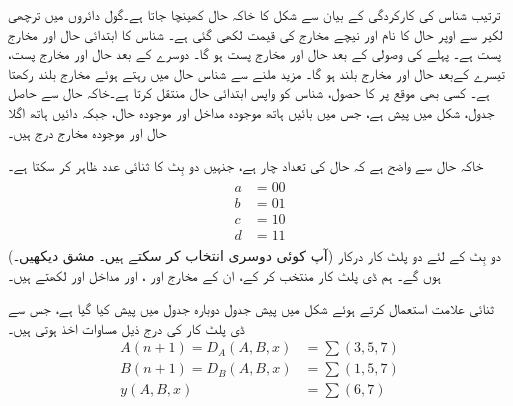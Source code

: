 \quad
ترتیب  شناس کی کارکردگی کے بیان سے شکل  کا   خاکہ حال   کھینچا  جاتا ہے۔گول دائروں میں ترچھی لکیر  سے  اوپر حال کا نام اور  نیچے مخارج کی قیمت  لکھی گئی ہے۔ شناس  کا ابتدائی      حال   اور  مخارج پست   ہے۔ پہلے  کی وصولی کے بعد  حال  اور  مخارج پست  ہو گا۔ دوسرے  کے بعد حال  اور مخارج پست، تیسرے   کےبعد حال  اور مخارج بلند ہو گا۔   مزید  ملنے سے شناس حال  میں رہتے ہوئے مخارج بلند رکھتا ہے۔ کسی بھی موقع پر   کا حصول، شناس  کو واپس ابتدائی حال  منتقل کرتا ہے۔خاکہ حال سے حاصل جدول،  شکل   میں پیش ہے، جس میں بائیں ہاتھ موجودہ مداخل اور موجودہ حال، جبکہ  دائیں ہاتھ اگلا حال اور موجودہ مخارج درج ہیں۔

خاکہ حال سے واضح  ہے کہ حال کی تعداد چار ہے، جنہیں دو بِٹ کا ثنائی عدد ظاہر کر سکتا ہے۔
\begin{gather}
\begin{aligned}\label{مساوات_ترتیبی_شناس_حال_انتخاب}
a&=00\\
b&=01\\
c&=10\\
d&=11
\end{aligned}
\end{gather}
(آپ کوئی دوسری  انتخاب کر سکتے ہیں۔ مشق  دیکھیں۔)  دو بِٹ کے لئے دو پلٹ کار درکار ہوں گے۔ ہم ڈی پلٹ کار منتخب کر کے،  ان کے مخارج  اور ، اور مداخل   اور   لکھتے  ہیں۔

ثنائی علامت استعمال کرتے ہوئے شکل   میں پیش جدول  دوبارہ جدول  میں پیش کیا گیا ہے، جس سے ڈی پلٹ کار کی درج ذیل مساوات اخذ ہوتی ہیں۔
\begin{align*}
A(n+1)=D_A(A,B,x)&=\sum(3,5,7)\\
B(n+1)=D_B(A,B,x)&=\sum(1,5,7)\\
y(A,B,x)&=\sum(6,7)
\end{align*}

